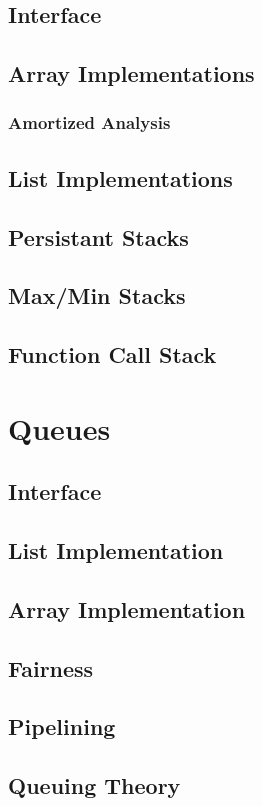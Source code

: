 \documentclass[12pt, letterpaper]{book}
\begin{document}
	\subsection{Interface}
	\subsection{Array Implementations}
		\subsubsection{Amortized Analysis}
	\subsection{List Implementations}
	\subsection{Persistant Stacks}
	\subsection{Max/Min Stacks}
	\subsection{Function Call Stack}

\section{Queues}
	\subsection{Interface}
	\subsection{List Implementation}
	\subsection{Array Implementation}
	\subsection{Fairness}
	\subsection{Pipelining}
	\subsection{Queuing Theory}
\end{document}
